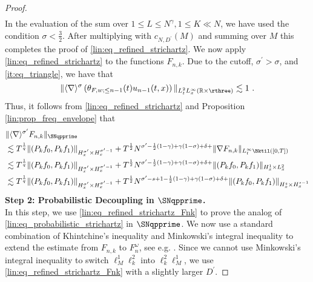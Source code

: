 \documentclass[11pt]{article}
\begin{document}
\begin{proof}
\begin{align*}
\end{align*}
In the evaluation of the sum over \( 1\leq L \leq N^\gamma, 1\leq K \ll N \), we have used the condition \( \sigma < \frac{3}{2} \). 
After multiplying with \( c_{N,D^\prime}(M) \) and summing over \( M \) this completes the proof of \eqref{lin:eq_refined_strichartz}.   
We now apply \eqref{lin:eq_refined_strichartz} to the functions \( F_{n,k} \). Due to the cutoff, \( \sigma^\prime > \sigma\), and \eqref{it:eq_triangle}, we have that
\begin{equation*}
\| \langle \nabla \rangle^{\sigma} \left( \theta_{F,w;\leq n-1}(t) u_{n-1}(t,x) \right) \|_{L_t^2 L_x^\infty(\mathbb{R}\times \rthree)} \lesssim 1~. 
\end{equation*}
Thus, it follows from \eqref{lin:eq_refined_strichartz} and  Proposition \ref{lin:prop_freq_envelope} that
\begin{equation}\label{lin:eq_refined_strichartz_Fnk}
\begin{aligned}
&\| \langle \nabla \rangle^{\sigma^\prime} F_{n,k} \|_{\SNqpprime} \\
&\lesssim  T^\frac{1}{q} \| (P_k f_0, P_k f_1) \|_{H_x^{\sigma^\prime}\times H_x^{\sigma^\prime-1}} +  T^{\frac{1}{2}}N^{\sigma^\prime-\frac{1}{2} (1-\gamma) + \gamma (1-\sigma) + \delta + } \| \nabla F_{n,k} \|_{L_t^\infty \Bktil([0,T])}  \\
&\lesssim T^\frac{1}{q} \| (P_k f_0, P_k f_1) \|_{H_x^{\sigma^\prime}\times H_x^{\sigma^\prime-1}} 
+  T^{\frac{1}{2}} N^{\sigma^\prime-\frac{1}{2} (1-\gamma) + \gamma (1-\sigma) + \delta + } \| ( P_k f_0 , P_k f_1 ) \|_{H_x^1\times L_x^2}  \\
&\lesssim T^\frac{1}{q} \| (P_k f_0, P_k f_1) \|_{H_x^{\sigma^\prime}\times H_x^{\sigma^\prime-1}} 
+  T^{\frac{1}{2}} N^{\sigma^\prime-s+1-\frac{1}{2} (1-\gamma) + \gamma (1-\sigma) + \delta + } \| ( P_k f_0 , P_k f_1 ) \|_{H_x^s\times H_x^{s-1}} 
\end{aligned}
\end{equation}
\textbf{Step 2: Probabilistic Decoupling in \( \SNqpprime\).} ~\\
In this step, we use \eqref{lin:eq_refined_strichartz_Fnk} to prove the analog of \eqref{lin:eq_probabilistic_strichartz} in \( \SNqpprime \).
We now use a standard combination of Khintchine's inequality and Minkowski's integral inequality to extend the estimate from \( F_{n,k} \) to  \( F_n^\omega \), see e.g. \cite{BOP15,LM16}. 
Since we cannot use Minkowski's integral inequality to switch \( \ell_M^1 \ell_k^2 \) into \( \ell_k^2 \ell_M^1 \), we use \eqref{lin:eq_refined_strichartz_Fnk} with a slightly larger \( D^\prime \). 


\end{proof}
\end{document}
